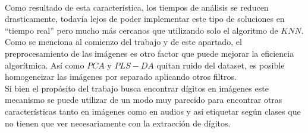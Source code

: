 \\
Como resultado de esta característica, los tiempos de análisis se reducen drasticamente, todavía lejos de poder implementar este tipo de soluciones en ``tiempo real'' pero mucho más cercanos que utilizando solo el algoritmo de $KNN$.
\\
Como se menciona al comienzo del trabajo y de este apartado, el preprocesamiento de las imágenes es otro factor que puede mejorar la eficiencia algorítmica. Así como $PCA$ y $PLS-DA$ quitan ruido del dataset, es posible homogeneizar las imágenes por separado aplicando otros filtros.
\\
Si bien el propósito del trabajo busca encontrar dígitos en imágenes este mecanismo se puede utilizar de un modo muy parecido para encontrar otras características tanto en imágenes como en audios y así etiquetar según clases que no tienen que ver necesariamente con la extracción de dígitos.